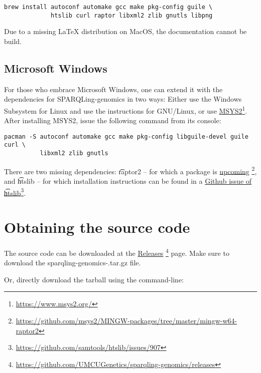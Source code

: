 \begin{lstlisting}
brew install autoconf automake gcc make pkg-config guile \
             htslib curl raptor libxml2 zlib gnutls libpng
\end{lstlisting}

  Due to a missing \LaTeX{} distribution on MacOS, the documentation
  cannot be build.

\subsection{Microsoft Windows}

  For those who embrace Microsoft Windows, one can extend it with the
  dependencies for SPARQLing-genomics in two ways: Either use the Windows
  Subsystem for Linux and use the instructions for GNU/Linux, or use
  \href{https://www.msys2.org/}{MSYS2}\footnote{\url{https://www.msys2.org/}}.
  After installing MSYS2, issue the following command from its console:

\begin{lstlisting}
pacman -S autoconf automake gcc make pkg-config libguile-devel guile curl \
          libxml2 zlib gnutls
\end{lstlisting}

  There are two missing dependencies: \t{raptor2} -- for which a package is
  \href{https://github.com/msys2/MINGW-packages/tree/master/mingw-w64-raptor2}{upcoming}%
  \footnote{\url{https://github.com/msys2/MINGW-packages/tree/master/mingw-w64-raptor2}},
  and \t{htslib} -- for which installation instructions can be found in a
  \href{https://github.com/samtools/htslib/issues/907}{Github issue of
    \t{htslib}}\footnote{\url{https://github.com/samtools/htslib/issues/907}}.

\section{Obtaining the source code}
\label{sec:obtaining-tarball}

  \begin{sloppypar}
  The source code can be downloaded at the
  \href{https://github.com/UMCUGenetics/sparqling-genomics/releases}%
  {Releases}%
  \footnote{\url{https://github.com/UMCUGenetics/sparqling-genomics/releases}}
  page.  Make sure to download the {\fontfamily{\ttdefault}\selectfont
    sparqling-genomics-\sgversion{}.tar.gz} file.
  \end{sloppypar}

  Or, directly download the tarball using the command-line:

